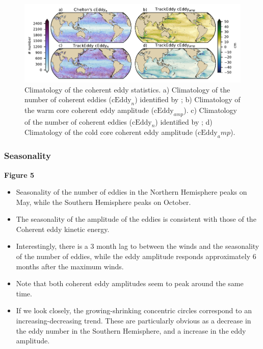 \documentclass[draft,linenumbers]{agujournal2019}
\newcommand{\cEddy}{\textrm{cEddy}}
\begin{document}
	\begin{figure}
	    \centering
	    \includegraphics[width=1\textwidth]{figures/global_stats_polarity.pdf}
	    \caption{Climatology of the coherent eddy statistics. a) Climatology of the number of coherent eddies ($\cEddy_n$) identified by \citet{Chelton_Global_2007}; b) Climatology of the warm core coherent eddy amplitude ($\cEddy_{amp}$). c) Climatology of the number of coherent eddies ($\cEddy_n$) identified by \citet{Martinez_Kinetic_2019}; d) Climatology of the cold core coherent eddy amplitude ($\cEddy_amp$).}
	    \label{fig:eddy_stats_climatology}
	\end{figure}


	\subsubsection{Seasonality}

	\textbf{Figure 5}
	\begin{itemize}
		\item Seasonality of the number of eddies in the Northern Hemisphere peaks on May, while the Southern Hemisphere peaks on October. 
		\item The seasonality of the amplitude of the eddies is consistent with those of the Coherent eddy kinetic energy. 
		\item Interestingly, there is a 3 month lag to between the winds and the seasonality of the number of eddies, while the eddy amplitude responds approximately 6 months after the maximum winds. 
		\item Note that both coherent eddy amplitudes seem to peak around the same time. 
		\item If we look closely, the growing-shrinking concentric circles correspond to an increasing-decreasing trend. These are particularly obvious as a decrease in the eddy number in the Southern Hemisphere, and a increase in the eddy amplitude. 
	\end{itemize}
\end{document}
